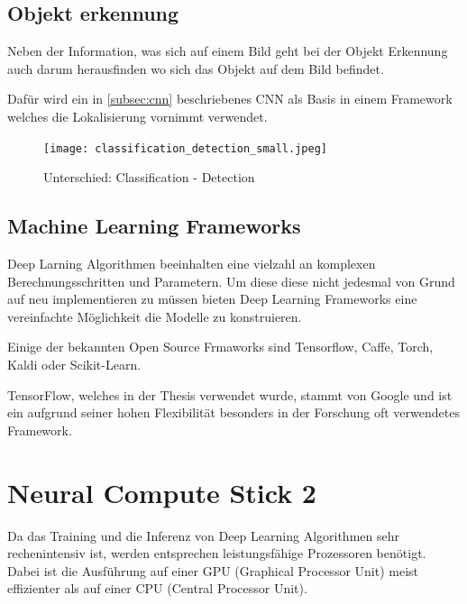 \subsection{Objekt erkennung}\label{subsec:objdet_det}

Neben der Information, was sich auf einem Bild geht bei der 
Objekt Erkennung auch darum herausfinden wo sich das 
Objekt auf dem Bild befindet.

Dafür wird ein in \ref{subsec:cnn} beschriebenes CNN als Basis 
in einem Framework welches die Lokalisierung vornimmt verwendet.

\begin{figure}[htb]
    \centering
    \label{fig:class_vs_det}
    \texttt{[image: classification\_detection\_small.jpeg]}
    \caption{Unterschied: Classification - Detection}
\end{figure}


\subsection{Machine Learning Frameworks}

Deep Larning Algorithmen beeinhalten eine vielzahl an komplexen
Berechnungsschritten und Parametern. Um diese diese nicht jedesmal 
von Grund auf neu implementieren zu müssen bieten Deep Learning 
Frameworks eine vereinfachte Möglichkeit die Modelle zu konstruieren.

Einige der bekannten Open Source Frmaworks sind Tensorflow,
Caffe, Torch, Kaldi oder Scikit-Learn.


TensorFlow, welches in der Thesis verwendet wurde, stammt von 
Google und ist ein aufgrund seiner hohen Flexibilität besonders 
in der Forschung oft verwendetes Framework.



\section{Neural Compute Stick 2}\label{ncs2}

Da das Training und die Inferenz von Deep Learning Algorithmen
 sehr rechenintensiv ist, werden entsprechen leistungsfähige 
Prozessoren benötigt. Dabei ist die Ausführung auf einer GPU 
(Graphical Processor Unit) meist effizienter als auf einer 
CPU (Central Processor Unit).

